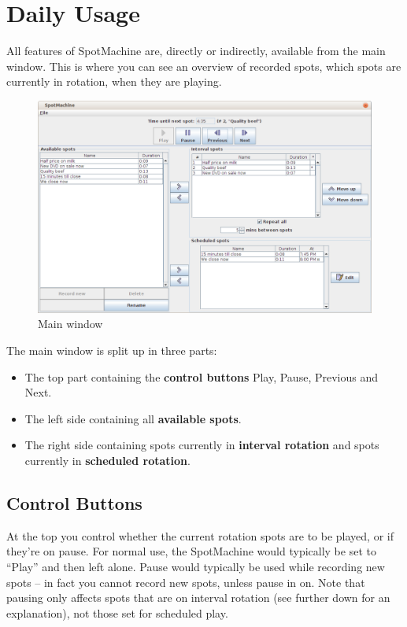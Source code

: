 \documentclass[a4paper,12pt]{report}
\begin{document}
\chapter{Daily Usage}
All features of SpotMachine are, directly or indirectly, available from the main
window. This is where you can see an overview of recorded spots, which spots are
currently in rotation, when they are playing.

\begin{figure}[h]
\centering \includegraphics[width=130mm]{mainwindow.png}
\caption{Main window}
\end{figure}

The main window is split up in three parts:
\begin{itemize}
\item The top part containing the {\bf control buttons} Play, Pause, Previous
      and Next.
\item The left side containing all {\bf available spots}.
\item The right side containing spots currently in {\bf interval rotation} and
      spots currently in {\bf scheduled rotation}.
\end{itemize}

\section{Control Buttons}
At the top you control whether the current rotation spots are to be played, or
if they're on pause. For normal use, the SpotMachine would typically be set to
``Play'' and then left alone. Pause would typically be used while recording new
spots -- in fact you cannot record new spots, unless pause in on. Note that
pausing only affects spots that are on interval rotation (see further down for
an explanation), not those set for scheduled play. %
\end{document}
